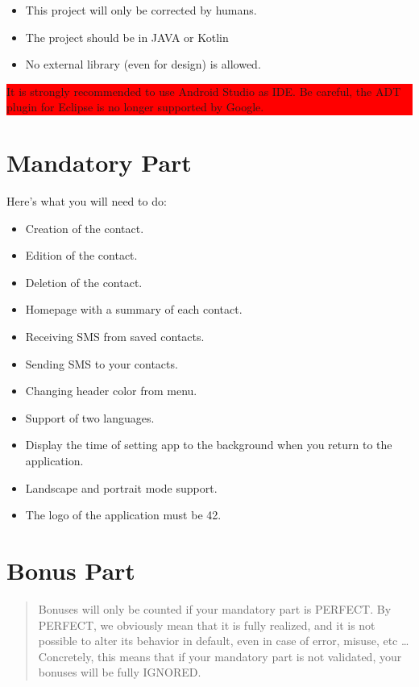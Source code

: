 \begin{itemize}
\tightlist{}
\item
  This project will only be corrected by humans.
\item
  The project should be in JAVA or Kotlin
\item
  No external library (even for design) is allowed.
\end{itemize}

\colorbox{red}{

	It is strongly recommended to use Android Studio as IDE. Be careful, the ADT plugin for Eclipse is no longer supported by Google.
}

\section{Mandatory Part}

Here's what you will need to do:

\begin{itemize}
\tightlist{}
\item
	Creation of the contact.
\item
	Edition of the contact.
\item
	Deletion of the contact.
\item
	Homepage with a summary of each contact.
\item
	Receiving SMS from saved contacts.
\item
	Sending SMS to your contacts.
\item
	Changing header color from menu.
\item
	Support of two languages.
\item
	Display the time of setting app to the background when you return to the application.
\item
	Landscape and portrait mode support.
\item
	The logo of the application must be 42.
\end{itemize}

\section{Bonus Part}

\begin{quote}
Bonuses will only be counted if your mandatory part is PERFECT. By
PERFECT, we obviously mean that it is fully realized, and it is not
possible to alter its behavior in default, even in case of error,
misuse, etc \ldots{} Concretely, this means that if your mandatory part
is not validated, your bonuses will be fully IGNORED.
\end{quote}

